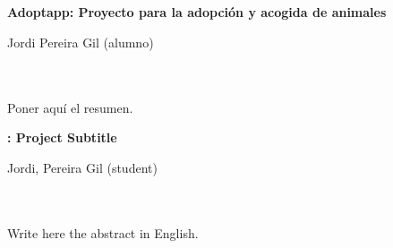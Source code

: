 \chapter*{}






\cleardoublepage
\thispagestyle{empty}

\begin{center}
{\large\bfseries Adoptapp: Proyecto para la adopción y acogida de animales}\\
\end{center}
\begin{center}
Jordi Pereira Gil (alumno)\\
\end{center}

\\

\vspace{0.7cm}
\\

Poner aquí el resumen.
\cleardoublepage


\thispagestyle{empty}


\begin{center}
{\large\bfseries \myTitle: Project Subtitle}\\
\end{center}
\begin{center}
Jordi, Pereira Gil (student)\\
\end{center}

\\

\vspace{0.7cm}
\\

Write here the abstract in English.

\chapter*{}
\thispagestyle{empty}


